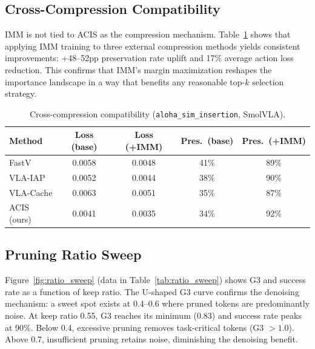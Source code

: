 \documentclass[10pt,twocolumn]{article}
\begin{document}
\subsection{Cross-Compression Compatibility}
\label{sec:cross_compress}

IMM is not tied to ACIS as the compression mechanism. Table~\ref{tab:cross_compress} shows that applying IMM training to three external compression methods yields consistent improvements: +48--52pp preservation rate uplift and 17\% average action loss reduction. This confirms that IMM's margin maximization reshapes the importance landscape in a way that benefits any reasonable top-$k$ selection strategy.

\begin{table}[t]
\centering
\caption{Cross-compression compatibility (\texttt{aloha\_sim\_insertion}, SmolVLA).}
\label{tab:cross_compress}
\begin{tabular}{lcccc}
\toprule
Method & Loss (base) & Loss (+IMM) & Pres.\ (base) & Pres.\ (+IMM) \\
\midrule
FastV & 0.0058 & 0.0048 & 41\% & 89\% \\
VLA-IAP & 0.0052 & 0.0044 & 38\% & 90\% \\
VLA-Cache & 0.0063 & 0.0051 & 35\% & 87\% \\
ACIS (ours) & 0.0041 & 0.0035 & 34\% & 92\% \\
\bottomrule
\end{tabular}
\end{table}

\subsection{Pruning Ratio Sweep}
\label{sec:ratio_sweep}

Figure~\ref{fig:ratio_sweep} (data in Table~\ref{tab:ratio_sweep}) shows G3 and success rate as a function of keep ratio. The U-shaped G3 curve confirms the denoising mechanism: a sweet spot exists at 0.4--0.6 where pruned tokens are predominantly noise. At keep ratio 0.55, G3 reaches its minimum (0.83) and success rate peaks at 90\%. Below 0.4, excessive pruning removes task-critical tokens (G3 $>1.0$). Above 0.7, insufficient pruning retains noise, diminishing the denoising benefit.
\end{document}
